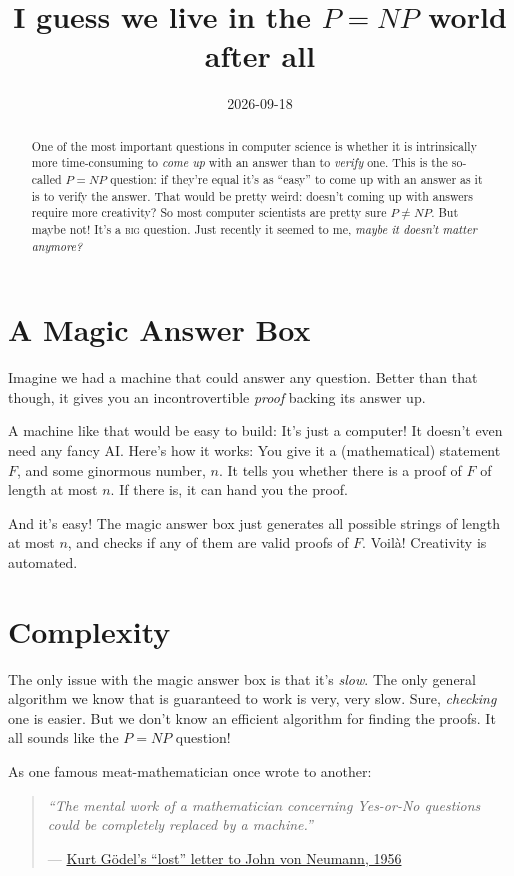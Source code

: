 \documentclass[11pt]{article}
\title{I guess we live in the $P = NP$ world after all}
\date{2026-09-18}
\newenvironment{promptbox}{\begin{quote}}{\end{quote}}
\begin{document}
\begin{abstract}
One of the most important questions in computer science is whether it is intrinsically
more time-consuming to \textit{come up} with an answer than to \textit{verify} one.
This is the so-called $P = NP$ question: if they're equal it's as ``easy'' to come up with an answer as it is to verify the answer.
That would be pretty weird: doesn't coming up with answers require more creativity? 
So most computer scientists are pretty sure $P \neq NP$. But maybe not! It's a \textsc{big} question.
Just recently it seemed to me, \textit{maybe it doesn't matter anymore?}
\end{abstract}

\section{A Magic Answer Box}

Imagine we had a machine that could answer any question. Better than that though, it gives you an 
incontrovertible \textit{proof} backing its answer up.

A machine like that would be easy to build: It's just a computer! It doesn't even need any fancy AI.
Here's how it works: You give it a (mathematical) statement $F$, and some ginormous number, $n$. 
It tells you whether there is a proof of $F$ of length at most $n$.
If there is, it can hand you the proof.

And it's easy! The magic answer box just generates all possible strings of length at most $n$, and checks if any of them are valid proofs of $F$. 
Voil\`a! Creativity is automated.

\section{Complexity}

The only issue with the magic answer box is that it's \textit{slow}. The only general algorithm we know that is guaranteed to work is very, very slow. 
Sure, \textit{checking} one is easier. But we don't know an efficient algorithm for finding the proofs. It all sounds like the $P = NP$ question! 

As one famous meat-mathematician once wrote to another: 

\begin{promptbox}
\large\itshape
``The mental work of a mathematician concerning Yes-or-No questions
could be completely replaced by a machine.''

\par\medskip
	\hfill\normalsize --- \href{https://rjlipton.com/the-gdel-letter}{Kurt G\"odel's ``lost'' letter to John von Neumann, 1956}
\end{promptbox}
\end{document}
